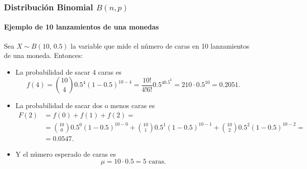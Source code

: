 \begin{frame}
\frametitle{Distribución Binomial $B(n,p)$}
\framesubtitle{Ejemplo de 10 lanzamientos de una monedas}
Sea $X\sim B(10,\,0.5)$ la variable que mide el número de caras en 10 lanzamientos de una moneda. Entonces:
\begin{itemize}
\item La probabilidad de sacar 4 caras es
\[
f(4) = \binom{10}{4}0.5^4 (1-0.5)^{10-4} = \frac{10!}{4!6!}0.5^40.5^6 = 210\cdot 0.5^{10} = 0.2051.
\]
\item La probabilidad de sacar dos o menos caras es
\begin{align*}
F(2) &= f(0) +f(1) + f(2) =\\
&= \binom{10}{0}0.5^0 (1-0.5)^{10-0} + \binom{10}{1}0.5^1 (1-0.5)^{10-1} + \binom{10}{2}0.5^2 (1-0.5)^{10-2} =\\
&= 0.0547.
\end{align*}
\item Y el número esperado de caras es 
\[ \mu = 10\cdot 0.5 = 5 \mbox{ caras}.\]   
\end{itemize}

\end{frame}


